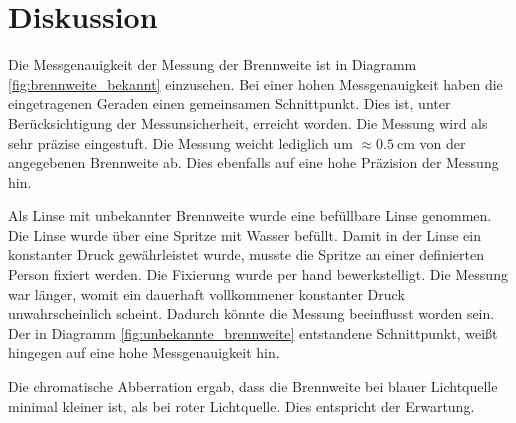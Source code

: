 \section{Diskussion}

Die Messgenauigkeit der Messung der Brennweite ist in Diagramm
\ref{fig:brennweite_bekannt} einzusehen. Bei einer hohen Messgenauigkeit haben
die eingetragenen Geraden einen gemeinsamen Schnittpunkt. Dies ist, unter
Berücksichtigung der Messunsicherheit, erreicht worden. Die Messung wird als
sehr präzise eingestuft. Die Messung weicht lediglich um
$\approx\SI{0,5}{\centi\meter}$ von der angegebenen Brennweite ab. Dies ebenfalls
auf eine hohe Präzision der Messung hin.

Als Linse mit unbekannter Brennweite wurde eine befüllbare Linse genommen. Die
Linse wurde über eine Spritze mit Wasser befüllt. Damit in der Linse ein konstanter
Druck gewährleistet wurde, musste die Spritze an einer definierten Person fixiert
werden. Die Fixierung wurde per hand bewerkstelligt. Die Messung war länger, womit
ein dauerhaft vollkommener konstanter Druck unwahrscheinlich scheint. Dadurch könnte
die Messung beeinflusst worden sein. Der in Diagramm
\ref{fig:unbekannte_brennweite} entstandene Schnittpunkt, weißt hingegen auf eine
hohe Messgenauigkeit hin.



Die chromatische Abberration ergab, dass die Brennweite bei blauer Lichtquelle
minimal kleiner ist, als bei roter Lichtquelle. Dies entspricht der Erwartung. 


